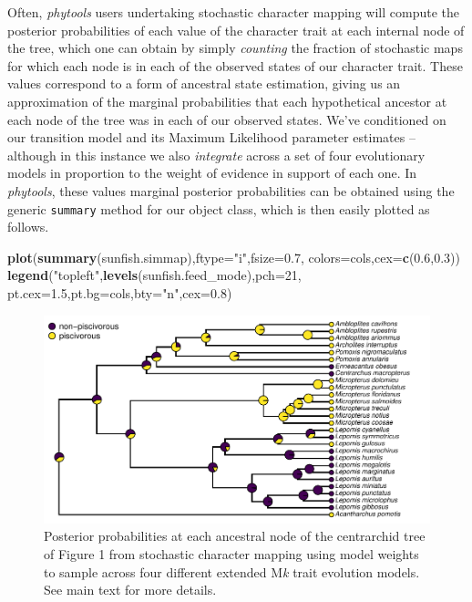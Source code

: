 \documentclass[fleqn,10pt,lineno]{wlpeerj} %
\newenvironment{Shaded}{\begin{snugshade}}{\end{snugshade}}
\newcommand{\AttributeTok}[1]{\textcolor[rgb]{0.13,0.29,0.53}{#1}}
\newcommand{\DecValTok}[1]{\textcolor[rgb]{0.00,0.00,0.81}{#1}}
\newcommand{\FloatTok}[1]{\textcolor[rgb]{0.00,0.00,0.81}{#1}}
\newcommand{\FunctionTok}[1]{\textcolor[rgb]{0.13,0.29,0.53}{\textbf{#1}}}
\newcommand{\NormalTok}[1]{#1}
\newcommand{\StringTok}[1]{\textcolor[rgb]{0.31,0.60,0.02}{#1}}
\begin{document}
Often, \emph{phytools} users undertaking stochastic character mapping will compute the posterior probabilities of each value of the character trait at each internal node of the tree, which one can obtain by simply \emph{counting} the fraction of stochastic maps for which each node is in each of the observed states of our character trait. These values correspond to a form of ancestral state estimation, giving us an approximation of the marginal probabilities that each hypothetical ancestor at each node of the tree was in each of our observed states. We've conditioned on our transition model and its Maximum Likelihood parameter estimates -- although in this instance we also \emph{integrate} across a set of four evolutionary models in proportion to the weight of evidence in support of each one. In \emph{phytools}, these values marginal posterior probabilities can be obtained using the generic \texttt{summary} method for our object class, which is then easily plotted as follows.

\begin{Shaded}
\begin{Highlighting}[]
\FunctionTok{plot}\NormalTok{(}\FunctionTok{summary}\NormalTok{(sunfish.simmap),}\AttributeTok{ftype=}\StringTok{"i"}\NormalTok{,}\AttributeTok{fsize=}\FloatTok{0.7}\NormalTok{,}
  \AttributeTok{colors=}\NormalTok{cols,}\AttributeTok{cex=}\FunctionTok{c}\NormalTok{(}\FloatTok{0.6}\NormalTok{,}\FloatTok{0.3}\NormalTok{))}
\FunctionTok{legend}\NormalTok{(}\StringTok{"topleft"}\NormalTok{,}\FunctionTok{levels}\NormalTok{(sunfish.feed\_mode),}\AttributeTok{pch=}\DecValTok{21}\NormalTok{,}
  \AttributeTok{pt.cex=}\FloatTok{1.5}\NormalTok{,}\AttributeTok{pt.bg=}\NormalTok{cols,}\AttributeTok{bty=}\StringTok{"n"}\NormalTok{,}\AttributeTok{cex=}\FloatTok{0.8}\NormalTok{)}
\end{Highlighting}
\end{Shaded}

\begin{figure}
\includegraphics[width=1\linewidth]{Revell.phytools-v2_peerj_files/figure-latex/posterior-probs-1} \caption{Posterior probabilities at each ancestral node of the centrarchid tree of Figure 1 from stochastic character mapping using model weights to sample across four different extended M\textit{k} trait evolution models. See main text for more details.}\label{fig:posterior-probs}
\end{figure}
\end{document}
